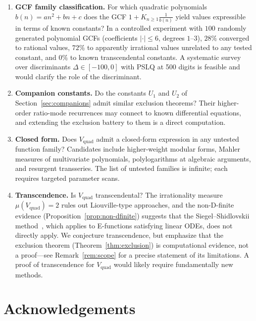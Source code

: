 \documentclass[11pt,a4paper]{article}
\theoremstyle{definition}
\theoremstyle{remark}
\newcommand{\Vq}{V_{\mathrm{quad}}}
\newcommand{\abs}[1]{\lvert #1 \rvert}
\begin{document}
\begin{enumerate}
\item \textbf{GCF family classification.}
  For which quadratic polynomials $b(n) = an^2 + bn + c$ does the
  GCF $1 + K_{n \ge 1} \frac{1}{b(n)}$ yield values expressible in
  terms of known constants?  In a controlled experiment with $100$
  randomly generated polynomial GCFs (coefficients $\abs{\cdot} \le 6$,
  degrees $1$--$3$), $28\%$ converged to rational values, $72\%$ to
  apparently irrational values unrelated to any tested constant, and
  $0\%$ to known transcendental constants.  A systematic survey over
  discriminants $\Delta \in [-100, 0]$ with PSLQ at 500 digits is
  feasible and would clarify the role of the discriminant.

\item \textbf{Companion constants.}
  Do the constants $U_1$ and $U_2$ of Section~\ref{sec:companions}
  admit similar exclusion theorems?  Their higher-order ratio-mode
  recurrences may connect to known differential equations, and
  extending the exclusion battery to them is a direct computation.

\item \textbf{Closed form.}
  Does $\Vq$ admit a closed-form expression in any untested function
  family?  Candidates include higher-weight modular forms, Mahler
  measures of multivariate polynomials, polylogarithms at algebraic
  arguments, and resurgent transseries.  The list of untested families
  is infinite; each requires targeted parameter scans.

\item \textbf{Transcendence.}
  Is $\Vq$ transcendental?  The irrationality measure $\mu(\Vq) = 2$
  rules out Liouville-type approaches, and the non-D-finite evidence
  (Proposition~\ref{prop:non-dfinite}) suggests that the
  Siegel--Shidlovskii method~\cite{nesterenko1996}, which applies to
  E-functions satisfying linear ODEs, does not directly apply.
  We conjecture transcendence, but emphasize that the exclusion
  theorem (Theorem~\ref{thm:exclusion}) is computational evidence,
  not a proof---see Remark~\ref{rem:scope} for a precise statement
  of its limitations.
  A proof of transcendence for $\Vq$ would likely require
  fundamentally new methods.
\end{enumerate}


\section*{Acknowledgements}
\end{document}
